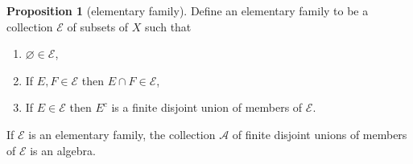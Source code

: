 \documentclass[12pt,a4paper]{book}
\newenvironment{enu}{\begin{enumerate}[(1)]}{\end{enumerate}}
\theoremstyle{definition}
\newtheorem{prop}[defn]{Proposition}
\begin{document}
\begin{prop}[elementary family]
    Define an elementary family to be a collection $\mathcal{E}$ of subsets of $X$ such that
    \begin{enu}
        \item $\varnothing \in \mathcal{E}$,
        \item If $E, F \in \mathcal{E}$ then $E \cap F \in \mathcal{E}$,
        \item If $E \in \mathcal{E}$ then $E^c$ is a finite disjoint union of members of $\mathcal{E}$.
    \end{enu}
    If $\mathcal{E}$ is an elementary family, the collection $\mathcal{A}$ of finite disjoint unions of members of $\mathcal{E}$ is an algebra.
    \label{proposition:elementary family}
\end{prop}
\end{document}
